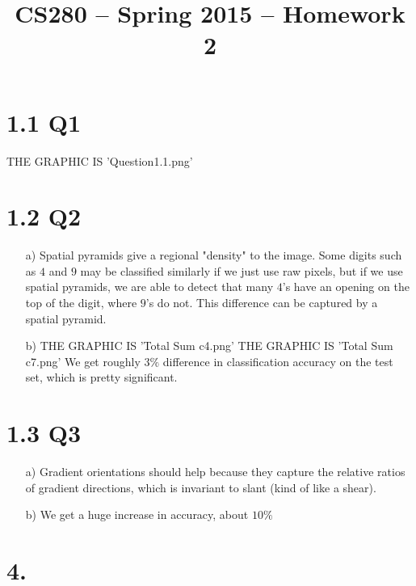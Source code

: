\documentclass[11pt]{article}
\title{CS280 -- Spring 2015 -- Homework 2}
\author{\Name}
\begin{document}
\maketitle

\section*{1.1 Q1}
THE GRAPHIC IS 'Question1.1.png'
\newpage
\section*{1.2 Q2}
\begin{itemize}
\item[a)]
Spatial pyramids give a regional "density" to the image. Some digits such as $4$ and $9$ may be classified similarly if we just use raw pixels, but if we use spatial pyramids, we are able to detect that many $4$'s have an opening on the top of the digit, where $9$'s do not. This difference can be captured by a spatial pyramid.
\item[b)]
THE GRAPHIC IS 'Total Sum c4.png'
THE GRAPHIC IS 'Total Sum c7.png'
We get roughly $3\%$ difference in classification accuracy on the test set, which is pretty significant. 
\end{itemize}
\newpage


\newpage
\section*{1.3 Q3}	
\begin{itemize}
\item[a)]
Gradient orientations should help because they capture the relative ratios of gradient directions, which is invariant to slant (kind of like a shear).
\item[b)]
We get a huge increase in accuracy, about $10\%$
\end{itemize}
\newpage
\section*{4.}
\end{document}
